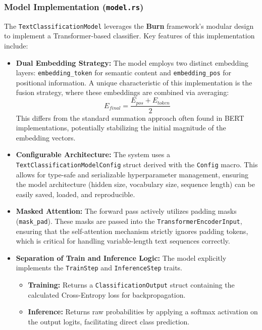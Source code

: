 \documentclass[10pt,a4paper,twocolumn]{article}
\begin{document}
\subsubsection{Model Implementation (\texttt{model.rs})}
The \texttt{TextClassificationModel} leverages the \textbf{Burn} framework's modular design to implement a Transformer-based classifier. Key features of this implementation include:
\begin{itemize}
    \item \textbf{Dual Embedding Strategy:} The model employs two distinct embedding layers: \texttt{embedding\_token} for semantic content and \texttt{embedding\_pos} for positional information. A unique characteristic of this implementation is the fusion strategy, where these embeddings are combined via averaging:
    \[
    E_{final} = \frac{E_{pos} + E_{token}}{2}
    \]
    This differs from the standard summation approach often found in BERT implementations, potentially stabilizing the initial magnitude of the embedding vectors.
    
    \item \textbf{Configurable Architecture:} The system uses a \texttt{TextClassificationModelConfig} struct derived with the \texttt{Config} macro. This allows for type-safe and serializable hyperparameter management, ensuring the model architecture (hidden size, vocabulary size, sequence length) can be easily saved, loaded, and reproducible.
    
    \item \textbf{Masked Attention:} The forward pass actively utilizes padding masks (\texttt{mask\_pad}). These masks are passed into the \texttt{TransformerEncoderInput}, ensuring that the self-attention mechanism strictly ignores padding tokens, which is critical for handling variable-length text sequences correctly.
    
    \item \textbf{Separation of Train and Inference Logic:} The model explicitly implements the \texttt{TrainStep} and \texttt{InferenceStep} traits. 
    \begin{itemize}
        \item \textbf{Training:} Returns a \texttt{ClassificationOutput} struct containing the calculated Cross-Entropy loss for backpropagation.
        \item \textbf{Inference:} Returns raw probabilities by applying a softmax activation on the output logits, facilitating direct class prediction.
    \end{itemize}
\end{itemize}
\end{document}

